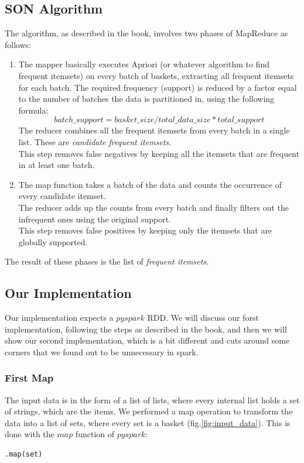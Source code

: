 \documentclass[a4paper]{article}
\begin{document}
	\subsection{SON Algorithm}	
	The algorithm, as described in the book, involves two phases of MapReduce as follows:
	\begin{enumerate}
	\item The mapper basically executes Apriori (or whatever algorithm to find frequent itemsets) on every batch of baskets, extracting all frequent itemsets for each batch. The required frequency (support) is reduced by a factor equal to the number of batches the data is partitioned in, using the following formula:
	\[ batch\_support = basket\_size / total\_data\_size * total\_support \]
	The reducer combines all the frequent itemsets from every batch in a single list. These are \textit{candidate frequent itemsets}.\\
	This step removes false negatives by keeping all the itemsets that are frequent in at least one batch.
	\item The map function takes a batch of the data and counts the occurrence of every candidate itemset.\\
	The reducer adds up the counts from every batch and finally filters out the infrequent ones using the original support.\\
	This step removes false positives by keeping only the itemsets that are globally supported.
	\end{enumerate}
	The result of these phases is the list of \textit{frequent itemsets}.
	
	\subsection{Our Implementation}
	Our implementation expects a $pyspark$ RDD. We will discuss our forst implementation, following the steps as described in the book, and then we will show our second implementation, 
	which is a bit different and cuts around some corners that we found out to be unnecessary in spark.
	
	\subsubsection{First Map}
	The input data is in the form of a list of lists, where every internal list holds a set of strings, which are the items.
	We performed a map operation to transform the data into a list of sets, where every set is a basket (fig.\ref{fig:input_data}). 
	This is done with the $map$ function of $pyspark$:
	\begin{lstlisting}[numbers=none]
.map(set)
	\end{lstlisting}
	
\end{document}
